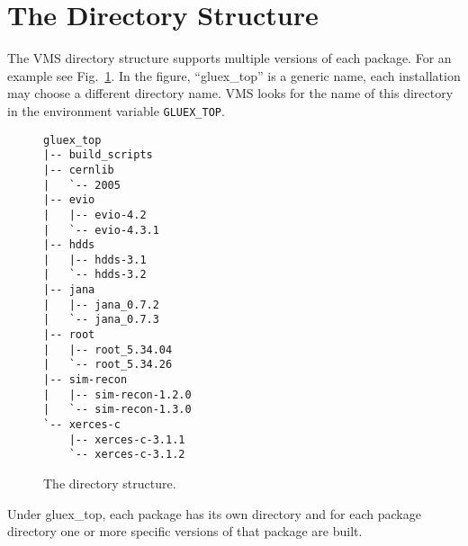 \documentclass{article}
\begin{document}
\section{The Directory Structure}

The VMS directory structure supports multiple versions of each package. For an example see Fig.~\ref{fig:directory-tree}. In the figure, ``gluex\_top'' is a generic name, each installation may choose a different directory name. VMS looks for the name of this directory in the environment variable {\tt GLUEX\_TOP}.

\begin{figure}
\begin{verbatim}
gluex_top
|-- build_scripts
|-- cernlib
|   `-- 2005
|-- evio
|   |-- evio-4.2
|   `-- evio-4.3.1
|-- hdds
|   |-- hdds-3.1
|   `-- hdds-3.2
|-- jana
|   |-- jana_0.7.2
|   `-- jana_0.7.3
|-- root
|   |-- root_5.34.04
|   `-- root_5.34.26
|-- sim-recon
|   |-- sim-recon-1.2.0
|   `-- sim-recon-1.3.0
`-- xerces-c
    |-- xerces-c-3.1.1
    `-- xerces-c-3.1.2
\end{verbatim}
\caption{The directory structure.}\label{fig:directory-tree}
\end{figure}

Under gluex\_top, each package has its own directory and for each package directory one or more specific versions of that package are built.
\end{document}
